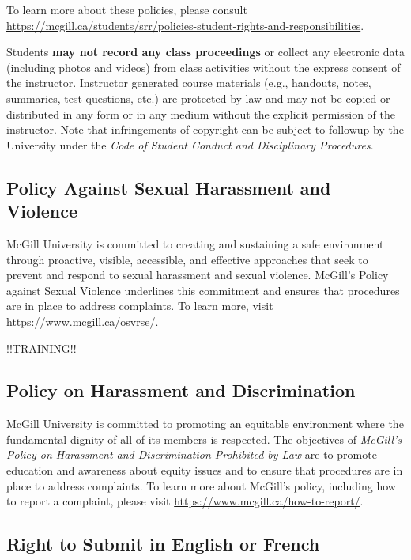 \documentclass{article}
\begin{document}
To learn more about these policies, please consult 
\url{https://mcgill.ca/students/srr/policies-student-rights-and-responsibilities}.

Students {\bf may not record any class proceedings} or collect any
electronic data (including photos and videos) from class activities
without the express consent of the instructor. Instructor generated
course materials (e.g., handouts, notes, summaries, test questions,
etc.) are protected by law and may not be copied or distributed in any
form or in any medium without the explicit permission of the
instructor. Note that infringements of copyright can be subject to
followup by the University under the {\em Code of Student Conduct and
Disciplinary Procedures}.

\newpage

\subsection{Policy Against Sexual Harassment and Violence}

McGill University is committed to creating and sustaining a safe
environment through proactive, visible, accessible, and effective
approaches that seek to prevent and respond to sexual harassment and
sexual violence. McGill's Policy against Sexual Violence underlines
this commitment and ensures that procedures are in place to address
complaints. To learn more, visit \url{https://www.mcgill.ca/osvrse/}.

!!TRAINING!!

\subsection{Policy on Harassment and Discrimination}

McGill University is committed to promoting an equitable environment
where the fundamental dignity of all of its members is respected. The
objectives of {\em McGill's Policy on Harassment and Discrimination
Prohibited by Law} are to promote education and awareness about equity
issues and to ensure that procedures are in place to address
complaints. To learn more about McGill's policy, including how to
report a complaint, please visit
\url{https://www.mcgill.ca/how-to-report/}.

\subsection{Right to Submit in English or French}
\end{document}
